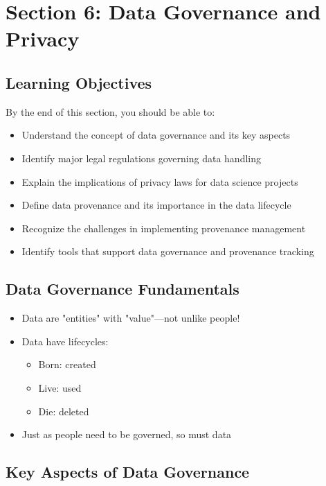 \documentclass[12pt]{article}
\begin{document}
\section{Section 6: Data Governance and Privacy}

\subsection{Learning Objectives}

By the end of this section, you should be able to:

\begin{itemize}
    \item Understand the concept of data governance and its key aspects
    \item Identify major legal regulations governing data handling
    \item Explain the implications of privacy laws for data science projects
    \item Define data provenance and its importance in the data lifecycle
    \item Recognize the challenges in implementing provenance management
    \item Identify tools that support data governance and provenance tracking
\end{itemize}

\subsection{Data Governance Fundamentals}

\begin{tcolorbox}[colback=yellow!5!white,colframe=yellow!75!black,title={Data as Valuable Entities}]
\begin{itemize}
    \item Data are "entities" with "value"—not unlike people!
    \item Data have lifecycles:
    \begin{itemize}
        \item Born: created
        \item Live: used
        \item Die: deleted
    \end{itemize}
    \item Just as people need to be governed, so must data
\end{itemize}
\end{tcolorbox}

\subsection{Key Aspects of Data Governance}
\end{document}
